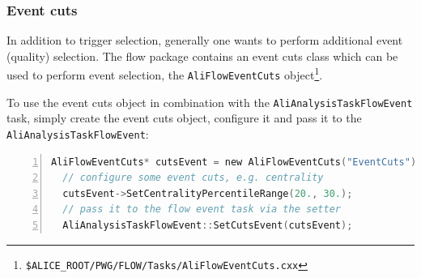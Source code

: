 \documentclass[a4paper]{book}
\numberwithin{equation}{subsection}
\begin{document}
\subsubsection{Event cuts}
In addition to trigger selection, generally one wants to perform additional event (quality) selection. The flow package contains an event cuts class which can be used to perform event selection, the \texttt{AliFlowEventCuts} object\footnote{\texttt{\$ALICE\_ROOT/PWG/FLOW/Tasks/AliFlowEventCuts.cxx}}. 

To use the event cuts object in combination with the \texttt{AliAnalysisTaskFlowEvent} task, simply create the event cuts object, configure it and pass it to the \texttt{AliAnalysisTaskFlowEvent}:
\begin{lstlisting}[language=C, numbers=left]
  AliFlowEventCuts* cutsEvent = new AliFlowEventCuts("EventCuts");
  // configure some event cuts, e.g. centrality
  cutsEvent->SetCentralityPercentileRange(20., 30.);
  // pass it to the flow event task via the setter
  AliAnalysisTaskFlowEvent::SetCutsEvent(cutsEvent);\end{lstlisting}
\end{document}
